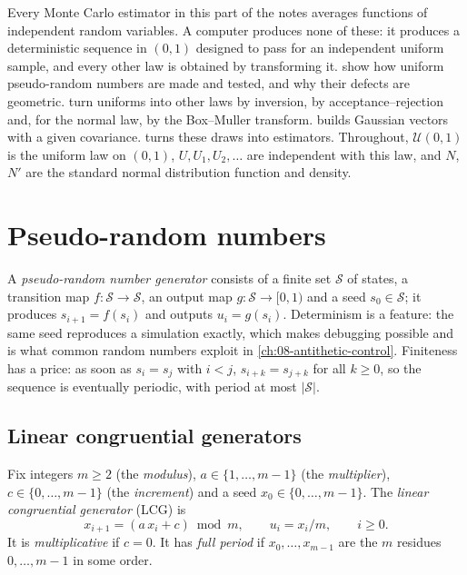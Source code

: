 
Every Monte Carlo estimator in this part of the notes averages functions of independent
random variables. A computer produces none of these: it produces a deterministic sequence in
$(0,1)$ designed to pass for an independent uniform sample, and every other law is obtained by
transforming it.  show how uniform pseudo-random
numbers are made and tested, and why their defects are geometric.
 turn uniforms into other laws by
inversion, by acceptance--rejection and, for the normal law, by the Box--Muller transform.
 builds Gaussian vectors with a given covariance.
 turns these draws into estimators. Throughout, $\mathcal U(0,1)$ is
the uniform law on $(0,1)$, $U,U_1,U_2,\dots$ are independent with this law, and $N$, $N'$
are the standard normal distribution function and density.

\section{Pseudo-random numbers}\label{sec:rng-uniform}

A \emph{pseudo-random number generator} consists of a finite set $\mathcal S$ of states, a
transition map $f:\mathcal S\to\mathcal S$, an output map $g:\mathcal S\to[0,1)$ and a seed
$s_0\in\mathcal S$; it produces $s_{i+1}=f(s_i)$ and outputs $u_i=g(s_i)$. Determinism is a
feature: the same seed reproduces a simulation exactly, which makes debugging possible and
is what common random numbers exploit in \cref{ch:08-antithetic-control}. Finiteness has a
price: as soon as $s_i=s_j$ with $i<j$, $s_{i+k}=s_{j+k}$ for all $k\ge0$, so the sequence is
eventually periodic, with period at most $|\mathcal S|$.

\subsection{Linear congruential generators}

\begin{definition}\label{def:rng-lcg}
Fix integers $m\ge2$ (the \emph{modulus}), $a\in\{1,\dots,m-1\}$ (the \emph{multiplier}),
$c\in\{0,\dots,m-1\}$ (the \emph{increment}) and a seed $x_0\in\{0,\dots,m-1\}$. The
\emph{linear congruential generator} (LCG) is
\[
  x_{i+1}=(a\,x_i+c)\bmod m,\qquad u_i=x_i/m,\qquad i\ge0 .
\]
It is \emph{multiplicative} if $c=0$. It has \emph{full period} if $x_0,\dots,x_{m-1}$ are
the $m$ residues $0,\dots,m-1$ in some order.
\end{definition}

